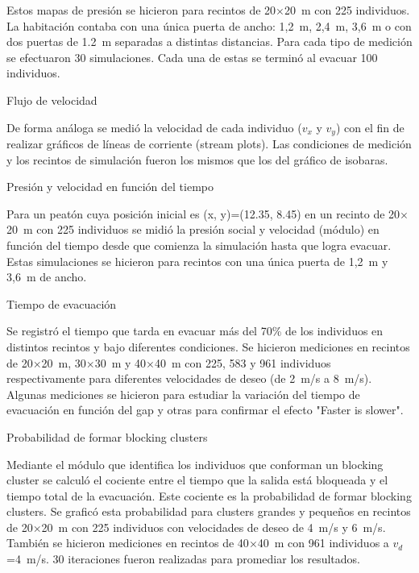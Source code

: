 
Estos mapas de presión se hicieron para recintos de 20$\times$20~m con 225 individuos. La habitación contaba con una única puerta de ancho: 1,2~m, 2,4~m, 3,6~m o con dos puertas de 1.2~m separadas a distintas distancias. Para cada tipo de medición se efectuaron 30 simulaciones. Cada una de estas se terminó al evacuar 100 individuos. 

{\Large Flujo de velocidad}

De forma análoga se medió la velocidad de cada individuo ($v_x$ y $v_y$) con el fin de realizar gráficos de líneas de corriente (stream plots). Las condiciones de medición y los recintos de simulación fueron los mismos que los del gráfico de isobaras. 

{\Large Presión y velocidad en función del tiempo}

Para un peatón cuya posición inicial es (x, y)=(12.35, 8.45) en un recinto de 20$\times$20~m con 225 individuos se midió la presión social y velocidad (módulo) en función del tiempo desde que comienza la simulación hasta que logra evacuar. Estas simulaciones se hicieron para recintos con una única puerta de 1,2~m y 3,6~m de ancho. 

{\Large Tiempo de evacuación}

Se registró el tiempo que tarda en evacuar más del 70\% de los individuos en distintos recintos y bajo diferentes condiciones. Se hicieron mediciones en recintos de 20$\times$20~m, 30$\times$30~m y 40$\times$40~m con 225, 583 y 961 individuos respectivamente para diferentes velocidades de deseo (de 2~m/s a 8~m/s). Algunas mediciones se hicieron para estudiar la variación del tiempo de evacuación en función del gap y otras para confirmar el efecto "Faster is slower". 

{\Large Probabilidad de formar blocking clusters}

Mediante el módulo que identifica los individuos que conforman un blocking cluster se calculó el cociente entre el tiempo que la salida está bloqueada y el tiempo total de la evacuación. Este cociente es la probabilidad de formar blocking clusters. Se graficó esta probabilidad para clusters grandes y pequeños en recintos de 20$\times$20~m con 225 individuos con velocidades de deseo de 4~m/s y 6~m/s. También se hicieron mediciones en recintos de 40$\times$40~m con 961 individuos a $v_d$=4~m/s. 30 iteraciones fueron realizadas para promediar los resultados. 

